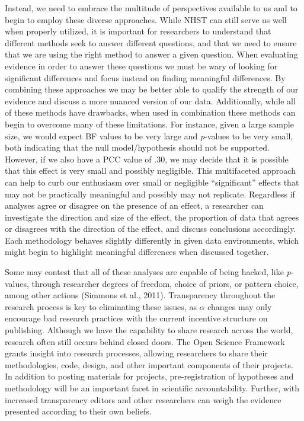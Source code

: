 \documentclass[english,mask,man]{apa6}
\theoremstyle{definition}
\theoremstyle{definition}
\theoremstyle{definition}
\theoremstyle{remark}
\begin{document}
Instead, we need to embrace the multitude of perspectives available to
us and to begin to employ these diverse approaches. While NHST can still
serve us well when properly utilized, it is important for researchers to
understand that different methods seek to answer different questions,
and that we need to ensure that we are using the right method to answer
a given question. When evaluating evidence in order to answer these
questions we must be wary of looking for significant differences and
focus instead on finding meaningful differences. By combining these
approaches we may be better able to qualify the strength of our evidence
and discuss a more nuanced version of our data. Additionally, while all
of these methods have drawbacks, when used in combination these methods
can begin to overcome many of these limitations. For instance, given a
large sample size, we would expect BF values to be very large and
\emph{p}-values to be very small, both indicating that the null
model/hypothesis should not be supported. However, if we also have a PCC
value of .30, we may decide that it is possible that this effect is very
small and possibly negligible. This multifaceted approach can help to
curb our enthusiasm over small or negligible \enquote{significant}
effects that may not be practically meaningful and possibly may not
replicate. Regardless if analyses agree or disagree on the presence of
an effect, a researcher can investigate the direction and size of the
effect, the proportion of data that agrees or disagrees with the
direction of the effect, and discuss conclusions accordingly. Each
methodology behaves slightly differently in given data environments,
which might begin to highlight meaningful differences when discussed
together.

Some may contest that all of these analyses are capable of being hacked,
like \emph{p}-values, through researcher degrees of freedom, choice of
priors, or pattern choice, among other actions (Simmons et al., 2011).
Transparency throughout the research process is key to eliminating these
issues, as \(\alpha\) changes may only encourage bad research practices
with the current incentive structure on publishing. Although we have the
capability to share research across the world, research often still
occurs behind closed doors. The Open Science Framework grants insight
into research processes, allowing researchers to share their
methodologies, code, design, and other important components of their
projects. In addition to posting materials for projects,
pre-registration of hypotheses and methodology will be an important
facet in scientific accountability. Further, with increased transparency
editors and other researchers can weigh the evidence presented according
to their own beliefs.
\end{document}
